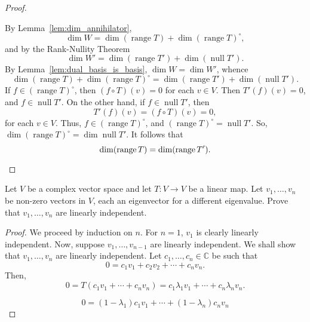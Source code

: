 \documentclass{article}
\begin{document}
\begin{proof}
\begin{enumerate}
		      By Lemma~\ref{lem:dim_annihilator},
		      \[
			      \dim W = \dim (\operatorname{range} T) + \dim (\operatorname{range} T)^{\circ}
			      ,\]
		      and by the Rank-Nullity Theorem
		      \[
			      \dim W' = \dim (\operatorname{range} T') + \dim (\operatorname{null} T')
			      .\]
		      By Lemma~\ref{lem:dual_basis_is_basis}, \(\dim W = \dim W'\), whence
		      \[
			      \dim (\operatorname{range} T) + \dim (\operatorname{range} T)^{\circ} = \dim (\operatorname{range} T') + \dim (\operatorname{null} T')
			      .\]
		      If \(f\in (\operatorname{range} T)^{\circ}\), then \((f\circ T)(v) =
		      0\) for each \(v\in V\).  Then \(T'(f)(v) = 0\), and \(f\in
		      \operatorname{null} T'\).  On the other hand, if \(f\in
		      \operatorname{null} T'\), then
		      \[
			      T'(f)(v) = (f\circ T)(v) = 0
			      ,\]
		      for each \(v\in V\).  Thus, \(f\in (\operatorname{range}
		      T)^{\circ}\), and \((\operatorname{range} T)^{\circ} =
		      \operatorname{null} T'\).  So, \(\dim (\operatorname{range} T)^{\circ} =
		      \dim \operatorname{null} T'\).  It follows that
		      \[
			      \dim (\operatorname{range} T) = \dim (\operatorname{range} T')
			      .\qedhere\]
	\end{enumerate}
\end{proof}

\begin{problem}
Let \(V\) be a complex vector space and let \(T\colon V\to V\) be a linear
map. Let \(v_1, \ldots, v_n\) be non-zero vectors in \(V\), each an eigenvector for a
different eigenvalue. Prove that \(v_1, \ldots, v_n\) are linearly independent.
\end{problem}
\begin{proof}
	We proceed by induction on \(n\).  For \(n=1\), \(v_1\) is clearly linearly
	independent.  Now, suppose \(v_1, \ldots, v_{n-1}\) are linearly independent.  We shall show that \(v_1, \ldots, v_{n}\) are linearly independent.  Let \(c_1, \ldots, c_n\in \mathbb{C}\) be such that
	\[
		0 = c_1v_1 + c_2v_2 + \cdots + c_nv_n
		.\]
	Then,
	\[
		0 = T(c_1v_1 + \cdots + c_nv_n) = c_1\lambda_1v_1 + \cdots + c_n\lambda_nv_n
		.\]

	\[
		0 = (1-\lambda_1)c_1v_1 + \cdots + (1-\lambda_n)c_nv_n
	\]
\end{proof}
\end{document}

